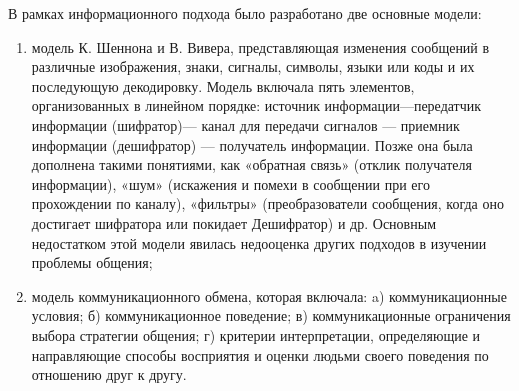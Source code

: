В рамках информационного подхода было разработано две основные модели:
\begin{enumerate}
	\item модель К. Шеннона и В. Вивера, представляющая изменения сообщений в различные изображения, знаки, сигналы, символы, языки или коды и их последующую декодировку. Модель включала пять элементов, организованных в линейном порядке: источник информации—передатчик информации (шифратор)— канал для передачи сигналов — приемник информации (дешифратор) — получатель информации. Позже она была дополнена такими понятиями, как «обратная связь» (отклик получателя информации), «шум» (искажения и помехи в сообщении при его прохождении по каналу), «фильтры» (преобразователи сообщения, когда оно достигает шифратора или покидает Дешифратор) и др. Основным недостатком этой модели явилась недооценка других подходов в изучении проблемы общения;
	\item модель коммуникационного обмена, которая включала:
		\subitem a) коммуникационные условия;
		\subitem б) коммуникационное поведение;
		\subitem в) коммуникационные ограничения выбора стратегии общения;
		\subitem г) критерии интерпретации, определяющие и направляющие способы восприятия и оценки людьми своего поведения по отношению друг к другу.
\end{enumerate}


